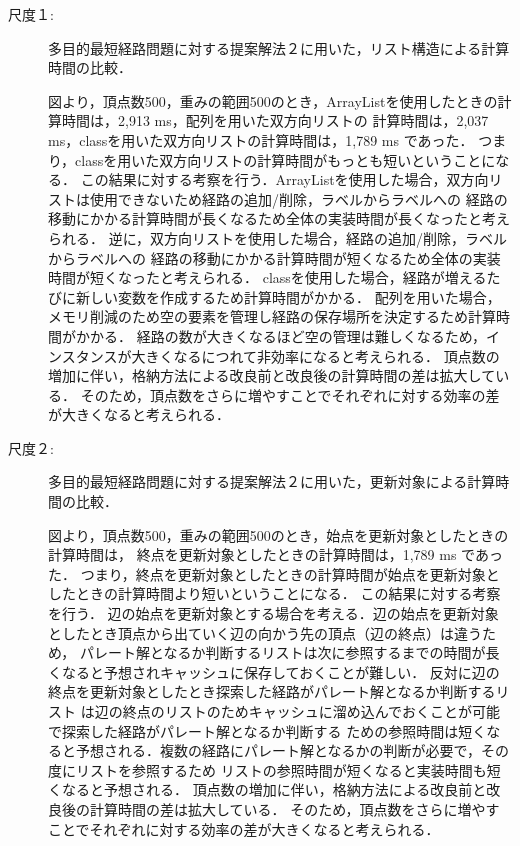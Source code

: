 \documentclass[12pt]{optlab-bachelor}
\begin{document}
\begin{description}
  \item[尺度１:]
  多目的最短経路問題に対する提案解法２に用いた，リスト構造による計算時間の比較．

  図より，頂点数500，重みの範囲500のとき，ArrayListを使用したときの計算時間は，2,913 ms，配列を用いた双方向リストの
  計算時間は，2,037 ms，classを用いた双方向リストの計算時間は，1,789 ms であった．
  つまり，classを用いた双方向リストの計算時間がもっとも短いということになる．
  この結果に対する考察を行う．ArrayListを使用した場合，双方向リストは使用できないため経路の追加/削除，ラベルからラベルへの
  経路の移動にかかる計算時間が長くなるため全体の実装時間が長くなったと考えられる．
  逆に，双方向リストを使用した場合，経路の追加/削除，ラベルからラベルへの
  経路の移動にかかる計算時間が短くなるため全体の実装時間が短くなったと考えられる．
  classを使用した場合，経路が増えるたびに新しい変数を作成するため計算時間がかかる．
  配列を用いた場合，メモリ削減のため空の要素を管理し経路の保存場所を決定するため計算時間がかかる．
  経路の数が大きくなるほど空の管理は難しくなるため，インスタンスが大きくなるにつれて非効率になると考えられる．
  頂点数の増加に伴い，格納方法による改良前と改良後の計算時間の差は拡大している．
  そのため，頂点数をさらに増やすことでそれぞれに対する効率の差が大きくなると考えられる．

\end{description}

\begin{description}
  \item[尺度２:]
  多目的最短経路問題に対する提案解法２に用いた，更新対象による計算時間の比較．

  図より，頂点数500，重みの範囲500のとき，始点を更新対象としたときの計算時間は，
  終点を更新対象としたときの計算時間は，1,789 ms であった．
  つまり，終点を更新対象としたときの計算時間が始点を更新対象としたときの計算時間より短いということになる．
  この結果に対する考察を行う．
  辺の始点を更新対象とする場合を考える．辺の始点を更新対象としたとき頂点から出ていく辺の向かう先の頂点（辺の終点）は違うため，
  パレート解となるか判断するリストは次に参照するまでの時間が長くなると予想されキャッシュに保存しておくことが難しい．
  反対に辺の終点を更新対象としたとき探索した経路がパレート解となるか判断するリスト
  は辺の終点のリストのためキャッシュに溜め込んでおくことが可能で探索した経路がパレート解となるか判断する
  ための参照時間は短くなると予想される．複数の経路にパレート解となるかの判断が必要で，その度にリストを参照するため
  リストの参照時間が短くなると実装時間も短くなると予想される．
  頂点数の増加に伴い，格納方法による改良前と改良後の計算時間の差は拡大している．
  そのため，頂点数をさらに増やすことでそれぞれに対する効率の差が大きくなると考えられる．

\end{description}
\end{document}
